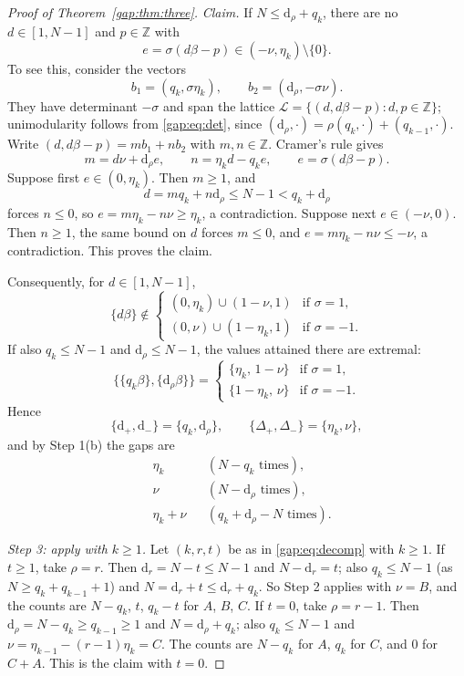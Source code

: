 \begin{proof}[Proof of Theorem~\ref{gap:thm:three}]
\emph{Claim.} If $N\le\mathrm d_\rho+q_k$, there are no $d\in[1,N-1]$ and $p\in\mathbb Z$ with
\[
e=\sigma(d\beta-p)\in(-\nu,\eta_k)\setminus\{0\}.
\]
To see this, consider the vectors
\[
b_1=(q_k,\sigma\eta_k),\qquad b_2=(\mathrm d_\rho,-\sigma\nu).
\]
They have determinant $-\sigma$ and span the lattice $\mathcal L=\{(d,d\beta-p):d,p\in\mathbb Z\}$;
unimodularity follows from \eqref{gap:eq:det}, since $(\mathrm d_\rho,\cdot)=\rho(q_k,\cdot)+(q_{k-1},\cdot)$.
Write $(d,d\beta-p)=mb_1+nb_2$ with $m,n\in\mathbb Z$. Cramer's rule gives
\[
m=d\nu+\mathrm d_\rho e,\qquad n=\eta_kd-q_ke,\qquad e=\sigma(d\beta-p).
\]
Suppose first $e\in(0,\eta_k)$. Then $m\ge1$, and
\[
d=mq_k+n\mathrm d_\rho\le N-1<q_k+\mathrm d_\rho
\]
forces $n\le0$, so $e=m\eta_k-n\nu\ge\eta_k$, a contradiction. Suppose next $e\in(-\nu,0)$. Then $n\ge1$, the same bound on $d$ forces $m\le0$, and $e=m\eta_k-n\nu\le-\nu$, a contradiction. This proves the claim.

Consequently, for $d\in[1,N-1]$,
\[
\{d\beta\}\notin
\begin{cases}
(0,\eta_k)\cup(1-\nu,1) & \text{if }\sigma=1,\\
(0,\nu)\cup(1-\eta_k,1) & \text{if }\sigma=-1.
\end{cases}
\]
If also $q_k\le N-1$ and $\mathrm d_\rho\le N-1$, the values attained there are extremal:
\[
\bigl\{\{q_k\beta\},\{\mathrm d_\rho\beta\}\bigr\}=
\begin{cases}
\{\eta_k,\,1-\nu\} & \text{if }\sigma=1,\\
\{1-\eta_k,\,\nu\} & \text{if }\sigma=-1.
\end{cases}
\]
Hence
\[
\{\mathrm d_+,\mathrm d_-\}=\{q_k,\mathrm d_\rho\},\qquad \{\Delta_+,\Delta_-\}=\{\eta_k,\nu\},
\]
and by Step 1(b) the gaps are
\begin{align*}
&\eta_k &&(N-q_k\text{ times}),\\
&\nu &&(N-\mathrm d_\rho\text{ times}),\\
&\eta_k+\nu &&(q_k+\mathrm d_\rho-N\text{ times}).
\end{align*}

\emph{Step 3: apply with $k\ge1$.} Let $(k,r,t)$ be as in \eqref{gap:eq:decomp} with $k\ge1$.
If $t\ge1$, take $\rho=r$. Then $\mathrm d_r=N-t\le N-1$ and $N-\mathrm d_r=t$; also
$q_k\le N-1$ (as $N\ge q_k+q_{k-1}+1$) and $N=\mathrm d_r+t\le\mathrm d_r+q_k$. So Step 2 applies with $\nu=B$, and the counts are $N-q_k$, $t$, $q_k-t$ for $A$, $B$, $C$.
If $t=0$, take $\rho=r-1$. Then $\mathrm d_\rho=N-q_k\ge q_{k-1}\ge1$ and $N=\mathrm d_\rho+q_k$;
also $q_k\le N-1$ and $\nu=\eta_{k-1}-(r-1)\eta_k=C$. The counts are $N-q_k$ for $A$, $q_k$ for $C$, and $0$ for $C+A$. This is the claim with $t=0$.
\end{proof}
